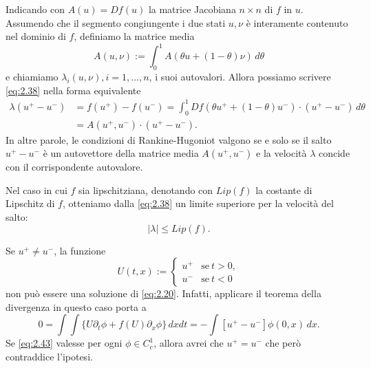 \begin{osservazione}
    Indicando con $A(u) = Df(u)$ la matrice Jacobiana $n\times n$ di $f$ in $u$. Assumendo che il segmento congiungente i due stati $u, \nu$ è interamente contenuto nel dominio di $f$, definiamo la matrice media
    \begin{equation}\label{eq:2.39}
        A(u,\nu) :=\int_{0}^{1}A(\theta u+(1-\theta)\nu)\,d\theta
    \end{equation}
    e chiamiamo $\lambda_{i}(u,\nu), i = 1,\ldots,n$, i suoi autovalori. Allora possiamo scrivere \eqref{eq:2.38} nella forma equivalente
    \begin{align}\label{eq:2.40}
        \lambda\left(u^{+}-u^{-}\right) &= f(u^{+})-f(u^{-}) = \int_{0}^{1}Df(\theta u^{+}+(1-\theta)u^{-})\cdot (u^{+}-u^{-})\,d\theta \nonumber\\
        &=A(u^{+},u^{-})\cdot (u^{+}-u^{-}).
    \end{align}
    In altre parole, le condizioni di Rankine-Hugoniot valgono se e solo se il salto $u^{+}-u^{-}$ è un autovettore della matrice media $A(u^{+},u^{-})$ e la velocità $\lambda$ concide con il corrispondente autovalore.
\end{osservazione}

\begin{osservazione}
    Nel caso in cui $f$ sia lipschitziana, denotando con $Lip(f)$ la costante di Lipschitz di $f$, otteniamo dalla \eqref{eq:2.38} un limite superiore per la velocità del salto:
    \begin{equation}\label{eq:2.41}
        |\lambda|\leq Lip(f).
    \end{equation}
\end{osservazione}

\begin{osservazione}\label{osservazione 2.6.3}
    Se $u^{+}\neq u^{-}$, la funzione
    \begin{equation}\label{eq:2.42}
        U(t,x) := 
        \begin{cases}
            u^{+} & \text{se} \ t>0, \\
            u^{-} & \text{se} \ t<0
        \end{cases}
    \end{equation}
    non può essere una soluzione di \eqref{eq:2.20}. Infatti, applicare il teorema della divergenza in questo caso porta a
    \begin{equation}\label{eq:2.43}
        0 = \int\int\{U\partial_{t}\phi+f(U)\partial_{x}\phi\}\,dxdt = -\int [u^{+}-u^{-}]\phi(0,x)\,dx.
    \end{equation}
    Se \eqref{eq:2.43} valesse per ogni $\phi\in C^{1}_{c}$, allora avrei che $u^{+}=u^{-}$ che però contraddice l'ipotesi.
\end{osservazione}


